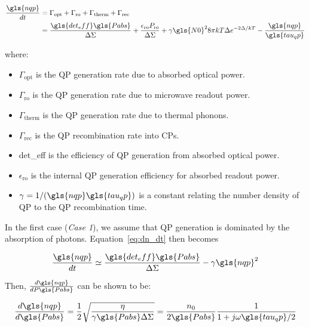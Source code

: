\begin{equation}\label{eq:dn_dt}
  \begin{aligned}
  \frac{\gls{nqp}}{dt} &= \Gamma_{\mathrm{opt}} + \Gamma_{\mathrm{ro}} + \Gamma_{\mathrm{therm}} + \Gamma_{\mathrm{rec}} \\
   &= \frac{\gls{det_eff} \gls{Pabs}}{\Delta \Sigma} + \frac{\epsilon_{\mathrm{ro}} P_{\mathrm{ro}}}{\Delta \Sigma} + \gamma \gls{N0}^{2} 8\pi k T \Delta e^{-2 \Delta / kT} -\frac{\gls{nqp}}{\gls{tau_qp}}
  \end{aligned}
\end{equation}

where:
\begin{itemize}[label={},nosep]
  \item $\Gamma_{\mathrm{opt}}$ is the QP generation rate due to absorbed optical power.
  \item $\Gamma_{\mathrm{ro}}$ is the QP generation rate due to microwave readout power.
  \item $\Gamma_{\mathrm{therm}}$ is the QP generation rate due to thermal phonons.
  \item $\Gamma_{\mathrm{rec}}$ is the QP recombination rate into CPs.
  \item \gls{det_eff} is the efficiency of QP generation from absorbed optical power.
  \item $\epsilon_{\mathrm{ro}}$ is the internal QP generation efficiency for absorbed readout power.
  \item $\gamma = 1/(\gls{nqp}\gls{tau_qp})$ is a constant relating the number density of QP to the QP recombination time.
\end{itemize}

In the first case (\textit{Case 1}), we assume that QP generation is dominated by the absorption of photons. Equation~\ref{eq:dn_dt} then becomes


\begin{equation}
    \frac{\gls{nqp}}{dt} \simeq \frac{\gls{det_eff} \gls{Pabs}}{\Delta \Sigma} - \gamma\gls{nqp}^{2}
\end{equation}

Then, $\frac{d\gls{nqp}}{dP\gls{Pabs}}$ can be shown to be:

\begin{equation}\label{eq:case1}
  \frac{d\gls{nqp}}{d\gls{Pabs}} = \frac{1}{2}\sqrt\frac{\eta}{\gamma \gls{Pabs}\Delta\Sigma} = \frac{n_{0}}{2\gls{Pabs}} \frac{1}{1 + j\omega\gls{tau_qp}/2}
\end{equation}

